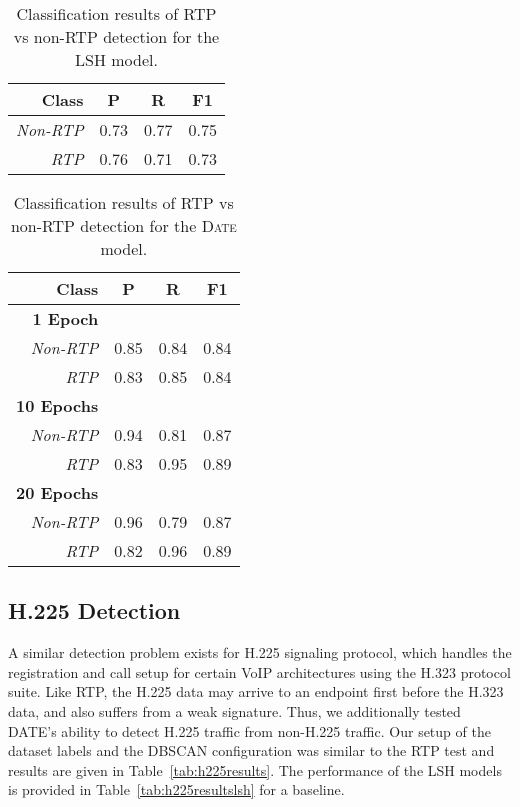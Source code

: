\begin{table} [h!]
\centering
\begin{tabular}{| r | c | c | c |}
\hline
Class & P & R & F1 \\
\hline
\textit{Non-RTP} & 0.73 & 0.77 & 0.75 \\
\textit{RTP} & 0.76 & 0.71 & 0.73 \\
\hline
\end{tabular}
\caption{Classification results of RTP vs non-RTP detection for the LSH model.}
\label{tab:rtpresultslsh}
\end{table}

\begin{table} [h!]
\centering
\begin{tabular}{| r | c | c | c |}
\hline
Class & P & R & F1 \\
\hline
\textbf{1 Epoch} &&& \\
\textit{Non-RTP} & 0.85 & 0.84 & 0.84 \\
\textit{RTP} & 0.83 & 0.85 & 0.84 \\
\hline
\textbf{10 Epochs} &&& \\
\textit{Non-RTP} & 0.94 & 0.81 & 0.87 \\
\textit{RTP} & 0.83 & 0.95 & 0.89 \\
\hline
\textbf{20 Epochs} &&& \\
\textit{Non-RTP} & 0.96 & 0.79 & 0.87 \\
\textit{RTP} & 0.82 & 0.96 & 0.89 \\
\hline
\end{tabular}
\caption{Classification results of RTP vs non-RTP detection for the \textsc{Date} model.}
\label{tab:rtpresults}
\end{table}

\subsection{H.225 Detection}
A similar detection problem exists for H.225 signaling protocol, which handles the registration and call setup for certain VoIP architectures using the H.323 protocol suite. Like RTP, the H.225 data may arrive to an endpoint first before the H.323 data, and also suffers from a weak signature. Thus, we additionally tested \textsc{DATE}'s ability to detect H.225 traffic from non-H.225 traffic. Our setup of the dataset labels and the DBSCAN configuration was similar to the RTP test and results are given in Table~\ref{tab:h225results}. The performance of the LSH models is provided in Table~\ref{tab:h225resultslsh} for a baseline.


